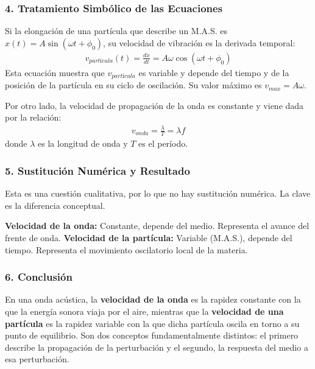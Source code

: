 \subsubsection*{4. Tratamiento Simbólico de las Ecuaciones}
Si la elongación de una partícula que describe un M.A.S. es $x(t) = A \sin(\omega t + \phi_0)$, su velocidad de vibración es la derivada temporal:
\begin{gather}
    v_{partícula}(t) = \frac{dx}{dt} = A\omega \cos(\omega t + \phi_0)
\end{gather}
Esta ecuación muestra que $v_{partícula}$ es variable y depende del tiempo y de la posición de la partícula en su ciclo de oscilación. Su valor máximo es $v_{max} = A\omega$.

Por otro lado, la velocidad de propagación de la onda es constante y viene dada por la relación:
\begin{gather}
    v_{onda} = \frac{\lambda}{T} = \lambda f
\end{gather}
donde $\lambda$ es la longitud de onda y $T$ es el período.

\subsubsection*{5. Sustitución Numérica y Resultado}
Esta es una cuestión cualitativa, por lo que no hay sustitución numérica. La clave es la diferencia conceptual.

\begin{cajaresultado}
    \textbf{Velocidad de la onda:} Constante, depende del medio. Representa el avance del frente de onda.
    \textbf{Velocidad de la partícula:} Variable (M.A.S.), depende del tiempo. Representa el movimiento oscilatorio local de la materia.
\end{cajaresultado}

\subsubsection*{6. Conclusión}
\begin{cajaconclusion}
    En una onda acústica, la \textbf{velocidad de la onda} es la rapidez constante con la que la energía sonora viaja por el aire, mientras que la \textbf{velocidad de una partícula} es la rapidez variable con la que dicha partícula oscila en torno a su punto de equilibrio. Son dos conceptos fundamentalmente distintos: el primero describe la propagación de la perturbación y el segundo, la respuesta del medio a esa perturbación.
\end{cajaconclusion}

